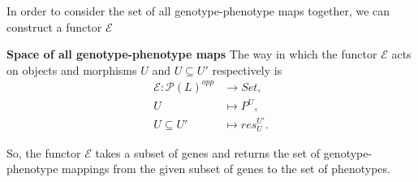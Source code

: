 \begin{frame}
In order to consider the set of all genotype-phenotype maps together, we can construct a functor $\mathcal{E}$
\begin{block}{\textbf{Space of all genotype-phenotype maps}}
The way in which the functor $\mathcal{E}$ acts on objects and morphisms $U$ and $U \subseteq U'$ respectively is
\begin{equation*}\label{eq:gpfunctor}
\begin{split}
\mathcal{E} \colon \mathcal{P}(L)^{opp} &\rightarrow Set,\\
U &\mapsto P^U,\\
U \subseteq U' &\mapsto res^{U'}_{U}.
\end{split}
\end{equation*}
\end{block}
So, the functor $\mathcal{E}$ takes a subset of genes and returns the set of genotype-phenotype mappings from the given subset of genes to the set of phenotypes.
\end{frame}
